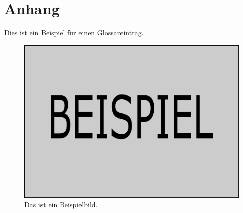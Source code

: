 \chapter{Anhang}
\thispagestyle{fancy}

Dies ist ein Beispiel für einen \gls{Glossareintrag}.

\begin{figure}[h]
\centering
\includegraphics[scale=0.5]{pics/Beispiel.png}
\caption{Das ist ein Beispielbild.}
\end{figure}

\lipsum[1-3]